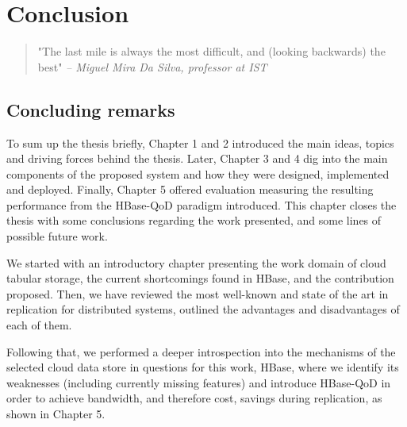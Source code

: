 
%
%
%


\chapter{Conclusion}
\label{ch:conclusion}

\begin{quotation}
  "The last mile is always the most difficult, and (looking backwards) the best"
  {\small\it -- Miguel Mira Da Silva, professor at IST}
\end{quotation}




\section{Concluding remarks}
To sum up the thesis briefly, Chapter 1 and 2 introduced the main ideas, topics and driving forces behind the thesis. Later, Chapter 3 and 4 dig into the main components of the proposed system and how they were designed, implemented and deployed. Finally, Chapter 5 offered evaluation measuring the resulting performance from the HBase-QoD paradigm introduced. This chapter closes the thesis with some conclusions regarding the work presented, and some lines of possible future work.

We started with an introductory chapter presenting the work domain of cloud tabular storage, the current shortcomings found in HBase, and the contribution proposed. Then, we have reviewed the most well-known and state of the art in replication for distributed systems, outlined the advantages and disadvantages of each of them.

Following that, we performed a deeper introspection into the mechanisms of the selected cloud data store in questions for this work, HBase, where we identify its weaknesses (including currently missing features) and introduce HBase-QoD in order to achieve bandwidth, and therefore cost, savings during replication, as shown in Chapter 5.

